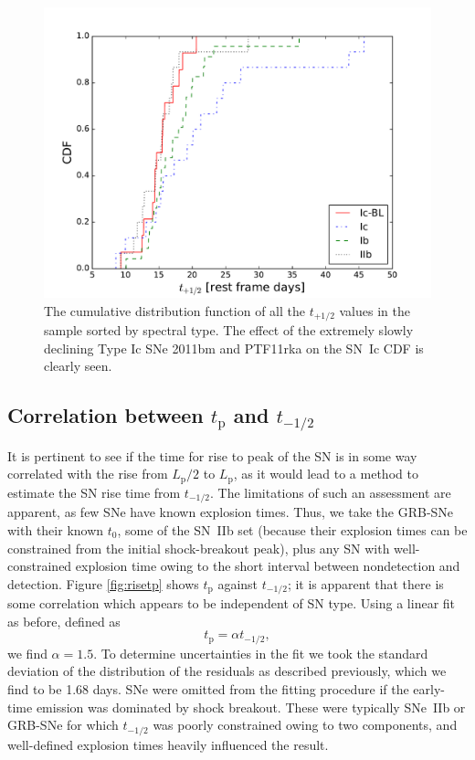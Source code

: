 \documentclass[a4paper,fleqn,usenatbib]{mnras}
\begin{document}
\begin{figure}
	\centering
	\includegraphics[scale=0.4]{decay-cumu.pdf}
	\caption{The cumulative distribution function of all the $t_{+1/2}$ values in the sample sorted by spectral type. The effect of the extremely slowly declining Type Ic SNe 2011bm and PTF11rka on the SN~Ic CDF is clearly seen.}
	\label{fig:decaycumu}
\end{figure}
 

\subsection{Correlation between $t_{\mathrm{p}}$ and $t_{-1/2}$}
It is pertinent to see if the time for rise to peak of the SN is in some way correlated with the rise from $L_{\mathrm{p}}/2$ to $L_{\mathrm{p}}$, as it would lead to a method to estimate the SN rise time from $t_{-1/2}$. The limitations of such an assessment are apparent, as few SNe have known explosion times. Thus, we take the GRB-SNe with their known $t_0$, some of the SN~IIb set (because their explosion times can be constrained from the initial shock-breakout peak), plus any SN with well-constrained explosion time owing to the short interval between nondetection and detection. Figure \ref{fig:risetp} shows $t_{\mathrm{p}}$ against $t_{-1/2}$; it is apparent that there is some correlation which appears to be independent of SN type. Using a linear fit as before, defined as
\begin{equation}
t_{\mathrm{p}}=\alpha t_{-1/2},
\label{fit2}
\end{equation}
we find $\alpha=1.5$. To determine uncertainties in the fit we took the standard deviation of the distribution of the residuals as described previously, which we find to be 1.68 days. SNe were omitted from the fitting procedure if the early-time emission was dominated by shock breakout. These were typically SNe~IIb or GRB-SNe for which $t_{-1/2}$ was poorly constrained owing to two components, and well-defined explosion times heavily influenced the result.
\end{document}
